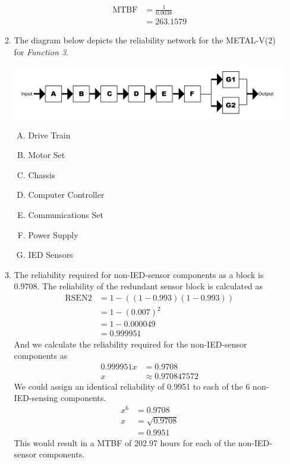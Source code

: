 \documentclass[letterpaper,10pt]{article}
\begin{document}
\begin{enumerate}
\begin{enumerate}
\begin{align*}
						\mbox{MTBF} &= \frac{1}{0.0038} \\
						&= 263.1579
					\end{align*}
				\item The diagram below depicts the reliability network for the METAL-V(2) for \emph{Function 3}.
					\begin{center}
					\includegraphics[scale=0.75]{ProjectAssignment1-4c.png}
						\end{center}
					\begin{enumerate}[A)]
						\item Drive Train
						\item Motor Set
						\item Chassis
						\item Computer Controller
						\item Communications Set
						\item Power Supply
						\item IED Sensors
					\end{enumerate}
				\item The reliability required for non-IED-sensor components as a block is 0.9708.  The reliability of the redundant sensor block is calculated as
					\begin{align*}
						\mbox{RSEN2} &= 1 - ((1 - 0.993)(1 - 0.993)) \\
						&= 1 - (0.007)^{2} \\
						&= 1 - 0.000049 \\
						&= 0.999951
					\end{align*}
					And we calculate the reliability required for the non-IED-sensor components as
					\begin{align*}
						0.999951x &= 0.9708 \\
						x &\approx 0.970847572 
					\end{align*}
					We could assign an identical reliability of 0.9951 to each of the 6 non-IED-sensing components.
					\begin{align*}
						x^{6} &= 0.9708 \\
						x &= \sqrt{0.9708} \\
						&= 0.9951
					\end{align*}
					This would result in a MTBF of 202.97 hours for each of the non-IED-sensor components.

\end{enumerate}
\end{enumerate}
\end{document}
